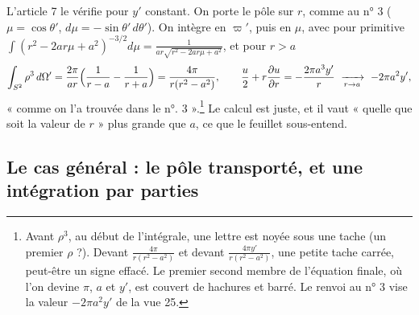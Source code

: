 \documentclass[11pt,a4paper]{article}
\begin{document}
L'article 7 le vérifie pour \(y'\) constant. On porte le pôle sur \(r\),
comme au n° 3 (\(\mu=\cos\theta'\), \(d\mu=-\sin\theta'\,d\theta'\)). On
intègre en \(\varpi'\), puis en \(\mu\), avec pour primitive
\(\int(r^2-2ar\mu+a^2)^{-3/2}d\mu=\frac{1}{ar\sqrt{r^2-2ar\mu+a^2}}\), et
pour \(r>a\)
\[
\int_{S^2}\rho^3\,d\Omega'=\frac{2\pi}{ar}\Bigl(\frac1{r-a}-\frac1{r+a}\Bigr)=\frac{4\pi}{r(r^2-a^2)},
\qquad
\frac u2+r\frac{\partial u}{\partial r}=-\frac{2\pi a^3y'}{r}\ \xrightarrow[r\to a]{}\ -2\pi a^2y',
\]
« comme on l'a trouvée dans le n°. 3 ».\footnote{Avant \(\rho^3\), au début de
l'intégrale, une lettre est noyée sous une tache (un premier \(\rho\) ?). Devant
\(\frac{4\pi}{r(r^2-a^2)}\) et devant \(\frac{4\pi y'}{r(r^2-a^2)}\), une petite
tache carrée, peut-être un signe effacé. Le premier second membre de
l'équation finale, où l'on devine \(\pi\), \(a\) et \(y'\), est couvert de
hachures et barré. Le renvoi au n° 3 vise la valeur \(-2\pi a^2y'\) de la
vue 25.} Le calcul est juste, et il vaut « quelle que soit la valeur de
\(r\) » plus grande que \(a\), ce que le feuillet sous-entend.

\subsection*{Le cas général : le pôle transporté, et une intégration par parties}
\end{document}
